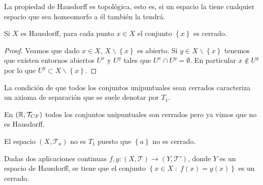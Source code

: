 \begin{observation}
La propiedad de Hausdorff es topológica, esto es, si un espacio la tiene cualquier espacio que sea homeomorfo a él también la tendrá. 
\end{observation}

\begin{prop}
	Si $\displaystyle X $ es Hausdorff, para cada punto $\displaystyle x \in X $ el conjunto $\displaystyle \left\{ x\right\}  $ es cerrado. 
\end{prop}
\begin{proof}
	Veamos que dado $\displaystyle x \in X $, $\displaystyle X \backslash \left\{ x\right\}  $ es abierto. Si $\displaystyle y \in X \backslash \left\{ x\right\}  $ tenemos que existen entornos abiertos $\displaystyle U^{x} $ y $\displaystyle U^{y} $ tales que $\displaystyle U^{x} \cap U^{y} = \emptyset $. En particular $\displaystyle x \not\in U^{y} $ por lo que $\displaystyle U^{y}\subset X \backslash \left\{ x\right\}  $. 
\end{proof}
\begin{notation}
La condición de que todos los conjuntos unipuntuales sean cerrados caracteriza un axioma de separación que se suele denotar por $\displaystyle T_{1} $. 
\end{notation}
\begin{eg}
En $\displaystyle \left(\mathbb{R}, \mathcal{T}_{CF}\right) $ todos los conjuntos unipuntuales son cerrados pero ya vimos que no es Hausdorff.
\end{eg}
\begin{eg}
	El espacio $\displaystyle \left(X, \mathcal{T}_{a}\right) $ no es $\displaystyle T_{1} $ puesto que $\displaystyle \left\{ a\right\}  $ no es cerrado.
\end{eg}
\begin{prop}
	Dadas dos aplicaciones continuas $\displaystyle f,g : \left(X, \mathcal{T}\right) \to \left(Y, \mathcal{T}'\right) $, donde $\displaystyle Y $ es un espacio de Hausdorff, se tiene que el conjunto $\displaystyle \left\{ x \in X \; : \; f\left(x\right) = g\left(x\right)\right\}  $ es un cerrado. 
\end{prop}
